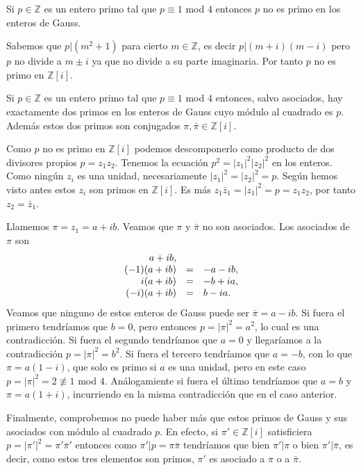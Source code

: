 
Si \(p\in\mathbb Z\) es un entero primo tal que \(p\equiv 1\) mod \(4\)
entonces \(p\) no es primo en los enteros de Gauss. 


Sabemos que \(p|(m^2+1)\) para cierto \(m\in\mathbb Z\), es decir
\(p|(m+i)(m-i)\) pero \(p\) no divide a \(m\pm i\) ya que no divide a su
parte imaginaria. Por tanto \(p\) no es primo en \(\mathbb Z[i]\).


Si \(p\in\mathbb Z\) es un entero primo tal que \(p\equiv 1\) mod \(4\)
entonces, salvo asociados, hay exactamente dos primos en los enteros de
Gauss cuyo módulo al cuadrado es \(p\). Además estos dos primos son
conjugados \(\pi,\bar\pi\in\mathbb Z[i]\). 


Como \(p\) no es primo en \(\mathbb Z[i]\) podemos descomponerlo como
producto de dos divisores propios \(p=z_1z_2\). Tenemos la ecuación
\(p^2=|z_1|^2|z_2|^2\) en los enteros. Como ningún \(z_i\) es una
unidad, necesariamente \(|z_1|^2=|z_2|^2=p\). Según hemos visto antes
estos \(z_i\) son primos en \(\mathbb Z[i]\). Es más
\(z_1\bar z_1=|z_1|^2=p=z_1z_2\), por tanto \(z_2=\bar z_1\).

Llamemos \(\pi=z_1=a+ib\). Veamos que \(\pi\) y \(\bar\pi\) no son
asociados. Los asociados de \(\pi\) son \[\begin{array}{rcl}
a+ib,&&\cr
(-1)(a+ib)&=&-a-ib,\cr
i(a+ib)&=&-b+ia,\cr
(-i)(a+ib)&=&b-ia.
\end{array}\] Veamos que ninguno de estos enteros de Gauss puede ser
\(\bar\pi=a-ib\). Si fuera el primero tendríamos que \(b=0\), pero
entonces \(p=|\pi|^2=a^2\), lo cual es una contradicción. Si fuera el
segundo tendríamos que \(a=0\) y llegaríamos a la contradicción
\(p=|\pi|^2=b^2\). Si fuera el tercero tendríamos que \(a=-b\), con lo
que \(\pi=a(1-i)\), que solo es primo si \(a\) es una unidad, pero en
este caso \(p=|\pi|^2=2\not\equiv 1\) mod \(4\). Análogamiente si fuera
el último tendríamos que \(a=b\) y \(\pi=a(1+i)\), incurriendo en la
misma contradicción que en el caso anterior.

Finalmente, comprobemos no puede haber más que estos primos de Gauss y
sus asociados con módulo al cuadrado \(p\). En efecto, si
\(\pi'\in\mathbb Z[i]\) satisficiera \(p=|\pi'|^2=\pi'\bar\pi'\)
entonces como \(\pi'|p=\pi\bar\pi\) tendríamos que bien \(\pi'|\pi\) o
bien \(\pi'|\bar\pi\), es decir, como estos tres elementos son primos,
\(\pi'\) es asociado a \(\pi\) o a \(\bar\pi\). 

